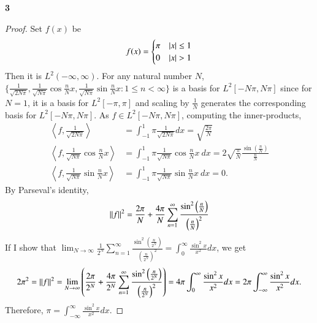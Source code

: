 \documentclass[a4paper, 12pt]{article}
\theoremstyle{Mydefinition}
\theoremstyle{Mytheorem}
\begin{document}
\noindent \textbf{3}
\begin{proof}
Set $f(x)$ be
\begin{equation}
    f(x) = \begin{cases}
    \pi & \abs{x}\leq 1\\
    0 & \abs{x}>1
    \end{cases}
\end{equation}
Then it is $L^2(-\infty, \infty)$. For any natural number $N$, $\{\frac{1}{\sqrt{2N\pi}}, \frac{1}{\sqrt{N\pi}}\cos \frac{n}{N}x, \frac{1}{\sqrt{N\pi}}\sin \frac{n}{N}x:1\leq n<\infty\}$ is a basis for $L^2[-N\pi, N\pi]$ since for $N=1$, it is a basis for $L^2[-\pi, \pi]$ and scaling by $\frac{1}{N}$ generates the corresponding basis for $L^2[-N\pi, N\pi]$. As $f\in L^2[-N\pi, N\pi]$, computing the inner-products,
\begin{equation}
    \begin{split}
        \left\langle f, \frac{1}{\sqrt{2N\pi}}\right\rangle & = \int_{-1}^1 \pi \frac{1}{\sqrt{2N\pi}} dx = \sqrt{\frac{2\pi}{N}} \\
        \left\langle f, \frac{1}{\sqrt{N\pi}}\cos \frac{n}{N}x\right\rangle & = \int_{-1}^1 \pi \frac{1}{\sqrt{N\pi}}\cos \frac{n}{N}x ~dx = 2\sqrt{\frac{\pi}{N}} \frac{\sin\left(\frac{n}{N}\right)}{\frac{n}{N}} \\
        \left\langle f, \frac{1}{\sqrt{N\pi}}\sin \frac{n}{N}x\right\rangle & = \int_{-1}^1 \pi \frac{1}{\sqrt{N\pi}}\sin \frac{n}{N}x ~dx = 0.
    \end{split}
\end{equation}
By Parseval's identity,
\begin{equation}
    \norm{f}^2 = \frac{2\pi}{N} + \frac{4\pi}{N}\sum_{n=1}^{\infty} \frac{\sin^2\left(\frac{n}{N}\right)}{\left(\frac{n}{N}\right)^2}
\end{equation}
If I show that $\lim_{N\rightarrow \infty}  \frac{1}{2^N}\sum_{n=1}^{\infty} \frac{\sin^2\left(\frac{n}{2^N}\right)}{\left(\frac{n}{2^N}\right)^2}=\int_0^\infty \frac{\sin^2 x}{x^2}dx$, we get
\begin{equation}
    2\pi^2 = \norm{f}^2 = \lim_{N\rightarrow \infty} \left(\frac{2\pi}{2^N} + \frac{4\pi}{2^N}\sum_{n=1}^{\infty} \frac{\sin^2\left(\frac{n}{2^N}\right)}{\left(\frac{n}{2^N}\right)^2}\right) = 4\pi\int_0^\infty \frac{\sin^2 x}{x^2} dx = 2\pi \int_{-\infty}^\infty \frac{\sin^2 x}{x^2} dx.
\end{equation}
Therefore, $\pi = \int_{-\infty}^\infty \frac{\sin^2 x}{x^2} dx$.


\end{proof}
\end{document}
